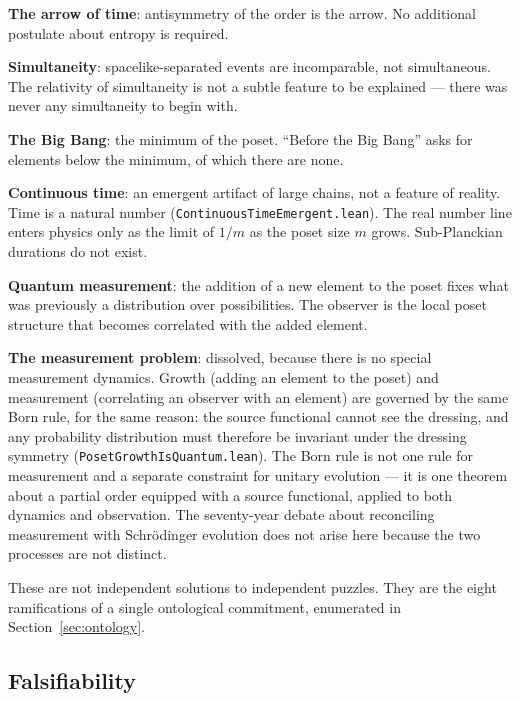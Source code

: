\documentclass[11pt,letterpaper]{article}
\theoremstyle{remark}
\newcommand{\lean}[1]{\texttt{\small #1}}
\begin{document}
\textbf{The arrow of time}: antisymmetry of the order is the arrow.
No additional postulate about entropy is required.

\textbf{Simultaneity}: spacelike-separated events are incomparable,
not simultaneous. The relativity of simultaneity is not a subtle
feature to be explained — there was never any simultaneity to begin
with.

\textbf{The Big Bang}: the minimum of the poset. ``Before the Big
Bang'' asks for elements below the minimum, of which there are none.

\textbf{Continuous time}: an emergent artifact of large chains, not
a feature of reality. Time is a natural number
(\lean{ContinuousTimeEmergent.lean}). The real number line enters
physics only as the limit of $1/m$ as the poset size $m$ grows.
Sub-Planckian durations do not exist.

\textbf{Quantum measurement}: the addition of a new element to the
poset fixes what was previously a distribution over possibilities.
The observer is the local poset structure that becomes correlated
with the added element.

\textbf{The measurement problem}: dissolved, because there is no
special measurement dynamics. Growth (adding an element to the
poset) and measurement (correlating an observer with an element) are
governed by the same Born rule, for the same reason: the source
functional cannot see the dressing, and any probability distribution
must therefore be invariant under the dressing symmetry
(\lean{PosetGrowthIsQuantum.lean}). The Born rule is not one rule for
measurement and a separate constraint for unitary evolution — it is
one theorem about a partial order equipped with a source functional,
applied to both dynamics and observation. The seventy-year debate
about reconciling measurement with Schr\"odinger evolution does not
arise here because the two processes are not distinct.

These are not independent solutions to independent puzzles. They are
the eight ramifications of a single ontological commitment,
enumerated in Section~\ref{sec:ontology}.

\subsection{Falsifiability}
\end{document}
